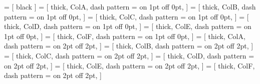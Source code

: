 \newlength{\wdtwenty}


 = [
	black
]
 = [
	thick, ColA, dash pattern = {on 1pt off 0pt},
]
 = [
	thick, ColB, dash pattern = {on 1pt off 0pt},
]
 = [
	thick, ColC, dash pattern = {on 1pt off 0pt},
]
 = [
	thick, ColD, dash pattern = {on 1pt off 0pt},
]
 = [
	thick, ColE, dash pattern = {on 1pt off 0pt},
]
 = [
	thick, ColF, dash pattern = {on 1pt off 0pt},
]
 = [
	thick, ColA, dash pattern = {on 2pt off 2pt},
]
 = [
	thick, ColB, dash pattern = {on 2pt off 2pt},
]
 = [
	thick, ColC, dash pattern = {on 2pt off 2pt},
]
 = [
	thick, ColD, dash pattern = {on 2pt off 2pt},
]
 = [
	thick, ColE, dash pattern = {on 2pt off 2pt},
]
 = [
	thick, ColF, dash pattern = {on 2pt off 2pt},
]
